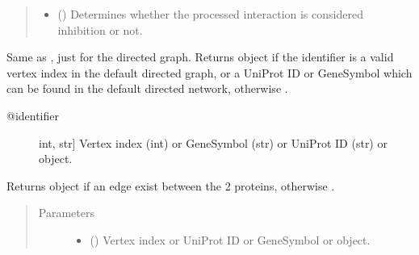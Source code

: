 \documentclass[letterpaper,10pt,english]{sphinxmanual}
\begin{document}
\begin{fulllineitems}
\begin{fulllineitems}
\begin{quote}
\begin{description}
\begin{itemize}
\item {} 
() \textendash{} Determines whether the processed interaction
is considered inhibition or not.

\end{itemize}


\end{description}\end{quote}

\end{fulllineitems}


\begin{fulllineitems}
\label{\detokenize{main:pypath.main.PyPath.protein}}
Same as , just for the directed graph.
Returns  object if the identifier
is a valid vertex index in the default directed graph,
or a UniProt ID or GeneSymbol which can be found in the
default directed network, otherwise .
\begin{description}
\item[{@identifier}] \leavevmode{[}int, str{]}
Vertex index (int) or GeneSymbol (str) or UniProt ID (str) or
 object.

\end{description}

\end{fulllineitems}


\begin{fulllineitems}
\label{\detokenize{main:pypath.main.PyPath.protein_edge}}
Returns  object if an edge exist between
the 2 proteins, otherwise .
\begin{quote}\begin{description}
\item[{Parameters}] \leavevmode\begin{itemize}
\item {} 
 (\sphinxstyleliteralemphasis{\sphinxupquote{,}}) \textendash{} Vertex index or UniProt ID or GeneSymbol or 
object.


\end{itemize}
\end{description}
\end{quote}
\end{fulllineitems}
\end{fulllineitems}
\end{document}
